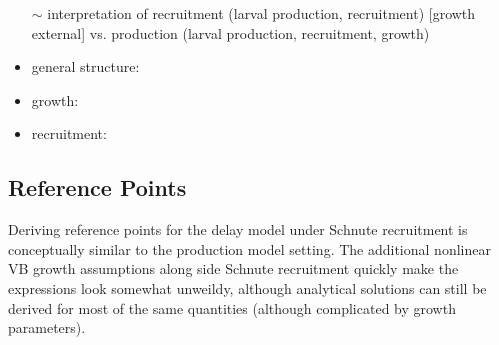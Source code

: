 %
\begin{itemize}
        \item[$\sim$] interpretation of recruitment (larval production, recruitment) [growth external] vs. production (larval production, recruitment, growth)
\end{itemize}

\begin{itemize}
\item general structure: \cite{walters_continuous_2020} \cite[pg. 334]{hilborn_quantitative_1992}
\item growth: \cite{von_bertalanffy_quantitative_1938}
\item recruitment: \cite{schnute_general_1985, schnute_analytical_1998}
\end{itemize}


%
\subsection{Reference Points}

%
Deriving reference points for the delay model under Schnute recruitment is
conceptually similar to the production model setting. The additional nonlinear
VB growth assumptions along side Schnute recruitment quickly make the
expressions look somewhat unweildy, although analytical solutions can still be
derived for most of the same quantities (although complicated by growth parameters).

